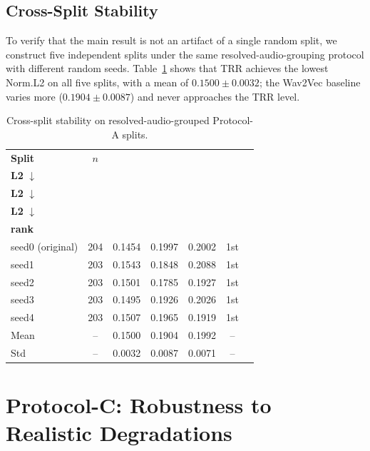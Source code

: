 \documentclass[journal,10pt]{IEEEtran}
\begin{document}
\subsection{Cross-Split Stability}

To verify that the main result is not an artifact of a single random split, we construct five independent splits under the same resolved-audio-grouping protocol with different random seeds. Table~\ref{tab:split_stability} shows that TRR achieves the lowest Norm.L2 on all five splits, with a mean of $0.1500 \pm 0.0032$; the Wav2Vec baseline varies more ($0.1904 \pm 0.0087$) and never approaches the TRR level.

\begin{table}[htbp]
\centering
\caption{Cross-split stability on resolved-audio-grouped Protocol-A splits.}
\label{tab:split_stability}
\footnotesize
\setlength{\tabcolsep}{3pt}
\begin{tabular}{lcccccc}
\toprule
\textbf{Split} & \textbf{$n$} & \makecell{\textbf{TRR}\\ \textbf{L2} $\downarrow$} & \makecell{\textbf{Wav2Vec}\\ \textbf{L2} $\downarrow$} & \makecell{\textbf{FeatureNN}\\ \textbf{L2} $\downarrow$} & \makecell{\textbf{TRR}\\ \textbf{rank}} \\
\midrule
seed0 (original) & 204 & 0.1454 & 0.1997 & 0.2002 & 1st \\
seed1 & 203 & 0.1543 & 0.1848 & 0.2088 & 1st \\
seed2 & 203 & 0.1501 & 0.1785 & 0.1927 & 1st \\
seed3 & 203 & 0.1495 & 0.1926 & 0.2026 & 1st \\
seed4 & 203 & 0.1507 & 0.1965 & 0.1919 & 1st \\
\midrule
Mean & -- & 0.1500 & 0.1904 & 0.1992 & -- \\
Std & -- & 0.0032 & 0.0087 & 0.0071 & -- \\
\bottomrule
\end{tabular}
\end{table}

\section{Protocol-C: Robustness to Realistic Degradations}
\end{document}
